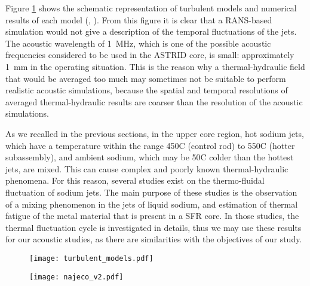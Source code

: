 \vspace{-4mm}
    Figure \ref{fig:turbulent_models} shows the schematic representation of turbulent models and numerical results of each model
(\cite{Poitou2009Modelisationdurayonnement}, \cite{Saxena2014Thermalhydraulicnumerical}).
From this figure it is clear that a RANS-based simulation would not give a description of the temporal fluctuations of the jets.
    The acoustic wavelength of \SI{1}{\mega\hertz}, which is one of the possible acoustic frequencies considered to be used in the ASTRID core, is small:
approximately \SI{1}{\milli\meter} in the operating situation. This is the reason why a thermal-hydraulic field that would be averaged too much
may sometimes not be suitable to perform realistic acoustic simulations, because the spatial and temporal resolutions of averaged thermal-hydraulic results
are coarser than the resolution of the acoustic simulations.

    As we recalled in the previous sections, in the upper core region, hot sodium jets, which have a temperature within the range \num{450}\textdegree{}C (control rod) to \num{550}\textdegree{}C (hotter subassembly), and ambient
sodium, which may be \num{50}\textdegree{}C colder than the hottest jets, are mixed. This can cause complex and poorly known thermal-hydraulic phenomena.
For this reason, several studies exist on the thermo-fluidal fluctuation of sodium jets. The main purpose of these studies is the observation of a mixing phenomenon in the jets
of liquid sodium, and estimation of thermal fatigue of the metal material that is present in a SFR core. In those studies, the thermal fluctuation cycle is investigated in
details, thus we may use these results for our acoustic studies, as there are similarities with the objectives of our study.

    \begin{figure}[htbp]
        \centerline{\texttt{[image: turbulent\_models.pdf]}}
        \label{fig:turbulent_models}
    \end{figure}

\vspace*{-7mm}
    \begin{figure}[htbp]
        \centerline{\texttt{[image: najeco\_v2.pdf]}}
        \label{fig:najeco}
    \end{figure}

